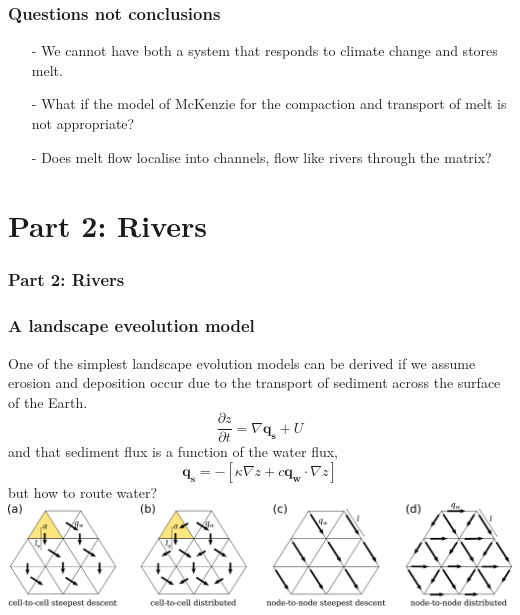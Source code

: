 \documentclass[aspectratio=169]{beamer}
\begin{document}
\begin{frame}
    \frametitle{Questions not conclusions}
    \begin{itemize}
        \item[-]{We cannot have both a system that responds to climate change and stores melt.}
        \item[-]{What if the model of McKenzie for the compaction and transport of melt is not appropriate?}
        \item[-]{Does melt flow localise into channels, flow like rivers through the matrix?}
    \end{itemize}
\end{frame}

\section{Part 2: Rivers}

{
\begin{frame}
    \frametitle{Part 2: Rivers}
\end{frame}
}

\begin{frame}
    \frametitle{A landscape eveolution model}
    One of the simplest landscape evolution models can be derived if we assume erosion and deposition occur due to the
    transport of sediment across the surface of the Earth.
    \[
    \frac{\partial z}{\partial t} = \nabla{\mathbf{q_{s}} + U}
    \]
    and that sediment flux is a function of the water flux,
    \[
    \mathbf{q_{s}} = - \left[\kappa \nabla{z} + c \mathbf{q_{w}} \cdot \nabla{z}\right]
    \]
    but how to route water?
    \includegraphics[width=0.8\paperwidth]{./figures/MFDandSFD.png}
\end{frame}
\end{document}
